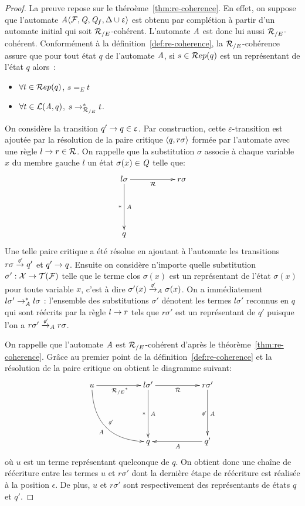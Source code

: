 \begin{proof}
  La preuve repose sur le théroème~\ref{thm:re-coherence}. En effet, on suppose que
  l'automate $\mathit A \langle \mathcal{F}, \mathit Q, \mathit Q_f, \Delta \cup \upvarepsilon\rangle$ est obtenu par complétion
  à partir d'un automate initial qui soit ${\mathcal R_{/E}}$-cohérent. 
  L'automate $\mathit A$ est donc lui aussi ${\mathcal R_{/E}}$-cohérent. 
  Conformément à la définition~\ref{def:re-coherence}, la ${\mathcal R_{/E}}$-cohérence
  assure que pour tout état $q$ de l'automate $\mathit A$, si $s \in \mathcal R ep (q)$ est un représentant de l'état $q$
  alors~:
  \begin{itemize}
  \item $\forall t \in \mathcal R ep(q)$, $s =_E t$
  \item $\forall t \in \mathcal{L}(\mathit A, q)$, $s \rightarrow_{\mathcal R_{/E}}^* t$.
  \end{itemize}

  On considère la transition $q' \rightarrow q \in \upvarepsilon$. Par construction, cette $\varepsilon$-transition est ajoutée
  par la résolution de la paire critique $\langle q, r\sigma\rangle$ formée par l'automate avec une règle $l\rightarrow r \in \mathcal R$.
  On rappelle que la substitution $\sigma$ associe à chaque variable $x$ du membre gauche $l$ un état $\sigma(x) \in \mathit Q$
  telle que:
  \[
  \xymatrix{
    l\sigma \ar[dd]^{\A}_{*} \ar[rr]_{\R}  & & r\sigma\\ %
    & & \\
    q & &%
  }
  \]
  Une telle paire critique a été résolue en ajoutant à l'automate les transitions $r\sigma \xrightarrow{\not\varepsilon} q'$ et $q' \rightarrow q$.
  Ensuite on considère n'importe quelle substitution $\sigma' : \mathcal X \rightarrow \mathcal{T(F)}$ telle que le terme clos $\sigma(x)$
  est un représentant de l'état $\sigma(x)$ pour toute variable $x$, c'est à dire $\sigma'(x) \xrightarrow{\not\varepsilon}_\mathit A \sigma(x)$.
  On a immédiatement $l\sigma' \rightarrow_{\mathit A}^* l\sigma$ :
  l'ensemble des substitutions $\sigma'$ dénotent les termes $l\sigma'$ reconnus en $q$ qui sont réécrits par la règle $l \rightarrow r$ 
  tels que  $r\sigma'$ est un représentant de $q'$ puisque l'on a $r\sigma' \xrightarrow{\not\varepsilon}_{\mathit A} r\sigma$.

  On rappelle que l'automate $\mathit A$ est ${\mathcal R_{/E}}$-cohérent d'après le théorème~\ref{thm:re-coherence}.
  Grâce au premier point de la définition~\ref{def:re-coherence} et la résolution de la paire critique
  on obtient le diagramme suivant:
  \[
  \xymatrix{
    u \ar[rr]_{\RE^*} \ar@/_2pc/[rrdd]^{\not\varepsilon}_{\A} & & l\sigma' \ar[dd]^{\A}_{*} \ar[rr]_{\R}  & & r\sigma' \ar[dd]^{\A}_{\not\varepsilon}\\
    & & & & \\
    & & q & & q' \ar[ll]^{\A}
  }
  \]
  où $u$ est un terme représentant quelconque de $q$. On obtient donc une chaîne de réécriture entre les termes $u$ et $r\sigma'$
  dont la dernière étape de réécriture est réalisée à la position $\epsilon$. De plus, 
  $u$ et $r\sigma'$ sont respectivement des représentants de états $q$ et $q'$.


\end{proof}
